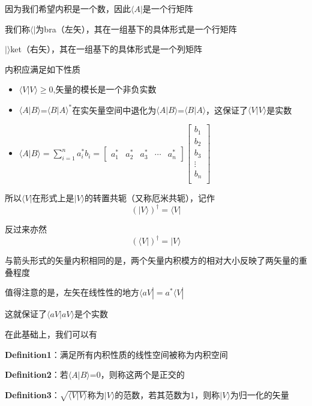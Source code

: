 \documentclass[lang=cn,10pt]{elegantbook}
\begin{document}
因为我们希望内积是一个数，因此$\langle A|$是一个行矩阵

我们称$\langle |$为bra（左矢），其在一组基下的具体形式是一个行矩阵

$|\rangle$ket（右矢），其在一组基下的具体形式是一个列矩阵

内积应满足如下性质
\begin{itemize}
	\item $\langle V|V\rangle \ge 0$,矢量的模长是一个非负实数
	\item $\langle A|B\rangle $=$\langle B|A\rangle^* $在实矢量空间中退化为$\langle A|B\rangle $=$\langle B|A\rangle $，这保证了$\langle V|V\rangle $是实数
	\item $\langle A|B\rangle =\sum_{i=1}^{n}a^{*}_i b_i=\left[ \begin{matrix}
		a_{1}^{*}&		a_{2}^{*}&		a_{3}^{*}&		\cdots&		a_{n}^{*}
	\end{matrix} \right] \left[ \begin{array}{c}
		b_1\\
		b_2\\
		b_3\\
		\vdots\\
		b_n\\
	\end{array} \right] $
\end{itemize}

所以$\langle V|$在形式上是$|V\rangle$的转置共轭（又称厄米共轭），记作
\begin{equation}
	\left( |V\rangle \right) ^{\dagger}=\langle V|
\end{equation}

反过来亦然
\begin{equation}
	\left( \langle V| \right) ^{\dagger}=|V\rangle 
\end{equation}

与箭头形式的矢量内积相同的是，两个矢量内积模方的相对大小反映了两矢量的重叠程度

值得注意的是，左矢在线性性的地方$\langle aV|=a^*\langle  V|$

这就保证了$\langle aV|aV\rangle $是个实数

在此基础上，我们可以有

\textbf{Definition1}：满足所有内积性质的线性空间被称为内积空间

\textbf{Definition2}：若$\langle A|B\rangle $=0，则称这两个是正交的

\textbf{Definition3}：$\sqrt{\langle V|V\rangle }$称为$|V\rangle$的范数，若其范数为1，则称$|V\rangle$为归一化的矢量
\end{document}

